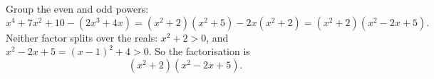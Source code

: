 Group the even and odd powers:
\[x^4+7x^2+10-\left(2x^3+4x\right)=\left(x^2+2\right)\left(x^2+5\right)-2x\left(x^2+2\right)=\left(x^2+2\right)\left(x^2-2x+5\right).\]
Neither factor splits over the reals: $x^2+2>0$, and $x^2-2x+5=(x-1)^2+4>0$. So the factorisation is
\[\boxed{\left(x^2+2\right)\left(x^2-2x+5\right)}.\]
